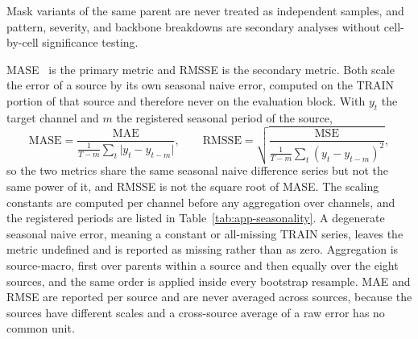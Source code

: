 \documentclass{article}
\begin{document}
Mask variants of the same parent are never
treated as independent samples, and pattern, severity, and backbone breakdowns are secondary
analyses without cell-by-cell significance testing.

MASE~\citep{hyndman2006mase} is the primary metric and RMSSE is the secondary metric. Both
scale the error of a source by its own seasonal naive error, computed on the TRAIN portion of
that source and therefore never on the evaluation block. With $y_t$ the target channel and $m$
the registered seasonal period of the source,
\begin{equation}
  \mathrm{MASE} = \frac{\mathrm{MAE}}{\frac{1}{T-m}\sum_{t} \lvert y_t - y_{t-m} \rvert},
  \qquad
  \mathrm{RMSSE} = \sqrt{\frac{\mathrm{MSE}}{\frac{1}{T-m}\sum_{t} (y_t - y_{t-m})^2}},
  \label{eq:metrics}
\end{equation}
so the two metrics share the same seasonal naive difference series but not the same power of
it, and RMSSE is not the square root of MASE. The scaling constants are computed per channel
before any aggregation over channels, and the registered periods are listed in
Table~\ref{tab:app-seasonality}. A degenerate seasonal naive error, meaning a constant or
all-missing TRAIN series, leaves the metric undefined and is reported as missing rather than
as zero. Aggregation is source-macro, first over parents within a source and then equally over
the eight sources, and the same order is applied inside every bootstrap resample. MAE and RMSE
are reported per source and are never averaged across sources, because the sources have
different scales and a cross-source average of a raw error has no common unit.

\begin{table}[h]
  \caption{Per-source seasonal periods and context conventions used by the metric
  denominators. Context length is $L = 512$ for every source. The seasonal period is the
  sampling-frequency period registered before any run, not a tuned quantity.}
  \label{tab:app-seasonality}
  \centering
  \small
  \setlength{\tabcolsep}{4pt}
\end{table}
\end{document}
